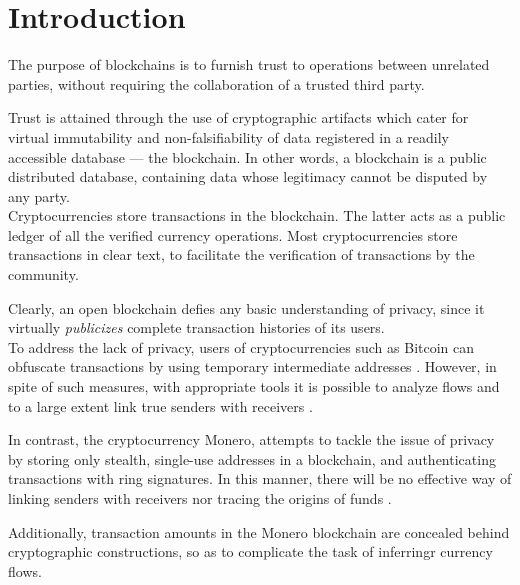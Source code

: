 

\chapter{Introduction}
\label{chap:introduction}

The purpose of blockchains is to furnish trust to operations between unrelated parties, without requiring the collaboration of a trusted third party.

Trust is attained through the use of cryptographic artifacts which cater for virtual immutability and non-falsifiability of data registered in a readily accessible database --- the blockchain.
In other words, a blockchain is a public distributed database, containing data whose legitimacy cannot 
be disputed by any party.
\\

Cryptocurrencies store transactions in the blockchain. The latter acts as a public ledger of all the verified currency operations. Most cryptocurrencies store transactions in clear text, to facilitate the verification of transactions by the community.

Clearly, an open blockchain defies any basic understanding of privacy, since it virtually 
{\em publicizes} complete transaction histories of its users. 
\\

To address the lack of privacy, users of cryptocurrencies such as Bitcoin can obfuscate transactions by using temporary intermediate addresses \cite{DBLP:journals/corr/NarayananM17}. However, in spite of such measures, with appropriate tools it is possible to analyze flows and to a large extent 
link true senders with receivers \cite{DBLP:journals/corr/ShenTuY15b, DK-police-tracing-btc, Andrew-Cox-Sandia}.

In contrast, the cryptocurrency Monero, attempts to tackle the issue of privacy by storing only stealth, single-use addresses in a blockchain, and authenticating transactions with ring signatures. In this manner, there will be no effective way of linking senders with receivers nor tracing the origins of funds \cite{Monero-intro}.

Additionally, transaction amounts in the Monero blockchain are concealed behind cryptographic constructions, so as to complicate the task of inferringr currency flows.

